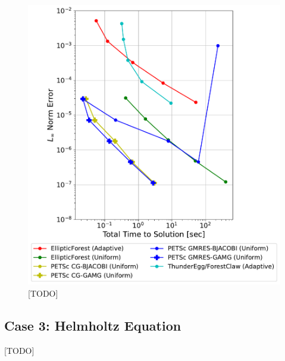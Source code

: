 \begin{figure}
    \centering
    \includegraphics[width=1.0\textwidth, clip=true, trim={40 20 80 50}]{figures/case02-work-precision-plots-no-title.pdf}
    \caption{[TODO]}
    \label{fig:case02-work-precision-plot}
\end{figure}

\subsection{Case 3: Helmholtz Equation}

[TODO]


